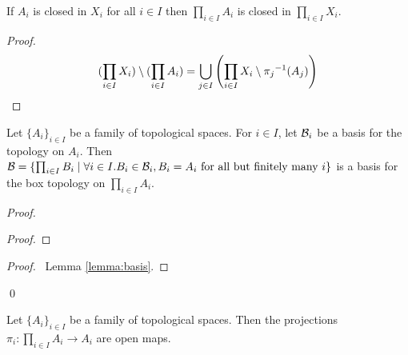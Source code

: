 \begin{proposition}
    \label{proposition:closed_product}
    If $A_i$ is closed in $X_i$ for all $i \in I$ then $\prod_{i \in I} A_i$ is closed in $\prod_{i \in I} X_i$.
\end{proposition}

\begin{proof}
    \pf
    \[ (\prod_{i \in I} X_i) \setminus (\prod_{i \in I} A_i) = \bigcup_{j \in I} \left( \prod_{i \in I} X_i \setminus {\pi_j}^{-1}(A_j) \right) \relax \]
\end{proof}

\begin{proposition}
    Let $\{ A_i \}_{i \in I}$ be a family of topological spaces. For $i \in I$, let $\mathcal{B}_i$ be a basis for the topology on $A_i$. Then $\mathcal{B} = \{ \prod_{i \in I} B_i \mid
    \forall i \in I. B_i \in \mathcal{B}_i, B_i = A_i \text{ for all but finitely many } i \}$ is a basis for the box topology on $\prod_{i \in I} A_i$.
\end{proposition}

\begin{proof}
    \pf
    \begin{proof}
    \end{proof}
    \qedstep
    \begin{proof}
        \pf\ Lemma \ref{lemma:basis}.
    \end{proof}
    \qed
\end{proof}

\begin{proposition}
    \label{proposition:open_map_projections}
    Let $\{ A_i \}_{i \in I}$ be a family of topological spaces. Then the projections $\pi_i : \prod_{i \in I} A_i \rightarrow A_i$ are open maps.
\end{proposition}

